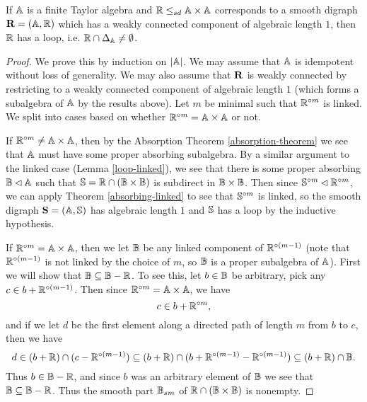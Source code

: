 \documentclass[letterpaper,11pt]{article}
\begin{document}
\begin{thm} If $\mathbb{A}$ is a finite Taylor algebra and $\mathbb{R} \le_{sd} \mathbb{A}\times \mathbb{A}$ corresponds to a smooth digraph $\mathbf{R} = (\mathbb{A},\mathbb{R})$ which has a weakly connected component of algebraic length $1$, then $\mathbb{R}$ has a loop, i.e. $\mathbb{R} \cap \Delta_{\mathbb{A}} \ne \emptyset$.
\end{thm}
\begin{proof} We prove this by induction on $|\mathbb{A}|$. We may assume that $\mathbb{A}$ is idempotent without loss of generality. We may also assume that $\mathbf{R}$ is weakly connected by restricting to a weakly connected component of algebraic length $1$ (which forms a subalgebra of $\mathbb{A}$ by the results above). Let $m$ be minimal such that $\mathbb{R}^{\circ m}$ is linked. We split into cases based on whether $\mathbb{R}^{\circ m} = \mathbb{A} \times \mathbb{A}$ or not.

If $\mathbb{R}^{\circ m} \ne \mathbb{A}\times \mathbb{A}$, then by the Absorption Theorem \ref{absorption-theorem} we see that $\mathbb{A}$ must have some proper absorbing subalgebra. By a similar argument to the linked case (Lemma \ref{loop-linked}), we see that there is some proper absorbing $\mathbb{B} \lhd \mathbb{A}$ such that $\mathbb{S} = \mathbb{R} \cap (\mathbb{B}\times \mathbb{B})$ is subdirect in $\mathbb{B} \times \mathbb{B}$. Then since $\mathbb{S}^{\circ m} \lhd \mathbb{R}^{\circ m}$, we can apply Theorem \ref{absorbing-linked} to see that $\mathbb{S}^{\circ m}$ is linked, so the smooth digraph $\mathbf{S} = (\mathbb{A},\mathbb{S})$ has algebraic length $1$ and $\mathbb{S}$ has a loop by the inductive hypothesis.

If $\mathbb{R}^{\circ m} = \mathbb{A}\times \mathbb{A}$, then we let $\mathbb{B}$ be any linked component of $\mathbb{R}^{\circ (m-1)}$ (note that $\mathbb{R}^{\circ (m-1)}$ is not linked by the choice of $m$, so $\mathbb{B}$ is a proper subalgebra of $\mathbb{A}$). First we will show that $\mathbb{B} \subseteq \mathbb{B}-\mathbb{R}$. To see this, let $b \in \mathbb{B}$ be arbitrary, pick any $c \in b + \mathbb{R}^{\circ (m-1)}$. Then since $\mathbb{R}^{\circ m} = \mathbb{A} \times \mathbb{A}$, we have
\[
c \in b+\mathbb{R}^{\circ m},
\]
and if we let $d$ be the first element along a directed path of length $m$ from $b$ to $c$, then we have
\[
d \in (b+\mathbb{R}) \cap (c - \mathbb{R}^{\circ (m-1)}) \subseteq (b+\mathbb{R}) \cap (b + \mathbb{R}^{\circ (m-1)} - \mathbb{R}^{\circ (m-1)}) \subseteq (b+\mathbb{R}) \cap \mathbb{B}.
\]
Thus $b \in \mathbb{B} - \mathbb{R}$, and since $b$ was an arbitrary element of $\mathbb{B}$ we see that $\mathbb{B} \subseteq \mathbb{B}-\mathbb{R}$. Thus the smooth part $\mathbb{B}_{sm}$ of $\mathbb{R}\cap (\mathbb{B}\times \mathbb{B})$ is nonempty.


\end{proof}
\end{document}
